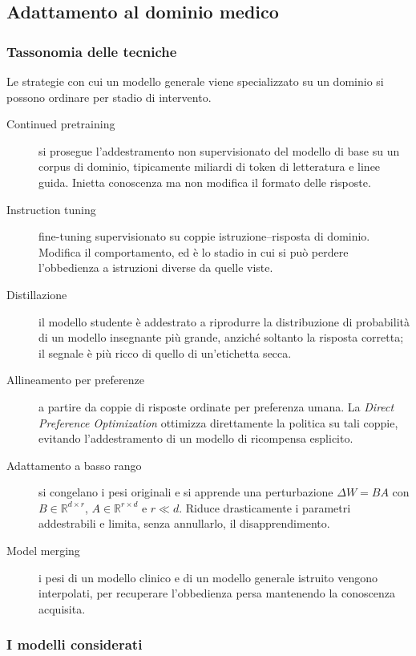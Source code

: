 \documentclass[pdflatex,sn-mathphys-num]{sn-jnl}
\theoremstyle{thmstyleone}
\theoremstyle{thmstyletwo}
\theoremstyle{thmstylethree}
\begin{document}
\subsection{Adattamento al dominio medico}\label{sec:finetuning}

\subsubsection{Tassonomia delle tecniche}\label{sec:tecniche-ft}

Le strategie con cui un modello generale viene specializzato su un dominio si possono ordinare per stadio di intervento.

\begin{description}
  \item[Continued pretraining] si prosegue l'addestramento non supervisionato del modello di base su un corpus di dominio, tipicamente miliardi di token di letteratura e linee guida. Inietta conoscenza ma non modifica il formato delle risposte.
  \item[Instruction tuning] fine-tuning supervisionato su coppie istruzione--risposta di dominio. Modifica il comportamento, ed è lo stadio in cui si può perdere l'obbedienza a istruzioni diverse da quelle viste.
  \item[Distillazione] \cite{hinton2015distilling} il modello studente è addestrato a riprodurre la distribuzione di probabilità di un modello insegnante più grande, anziché soltanto la risposta corretta; il segnale è più ricco di quello di un'etichetta secca.
  \item[Allineamento per preferenze] a partire da coppie di risposte ordinate per preferenza umana. La \emph{Direct Preference Optimization} \cite{rafailov2023dpo} ottimizza direttamente la politica su tali coppie, evitando l'addestramento di un modello di ricompensa esplicito.
  \item[Adattamento a basso rango] \cite{hu2022lora} si congelano i pesi originali e si apprende una perturbazione $\Delta W = BA$ con $B \in \mathbb{R}^{d \times r}$, $A \in \mathbb{R}^{r \times d}$ e $r \ll d$. Riduce drasticamente i parametri addestrabili e limita, senza annullarlo, il disapprendimento.
  \item[Model merging] i pesi di un modello clinico e di un modello generale istruito vengono interpolati, per recuperare l'obbedienza persa mantenendo la conoscenza acquisita.
\end{description}

\subsubsection{I modelli considerati}\label{sec:modelli-considerati}
\end{document}

